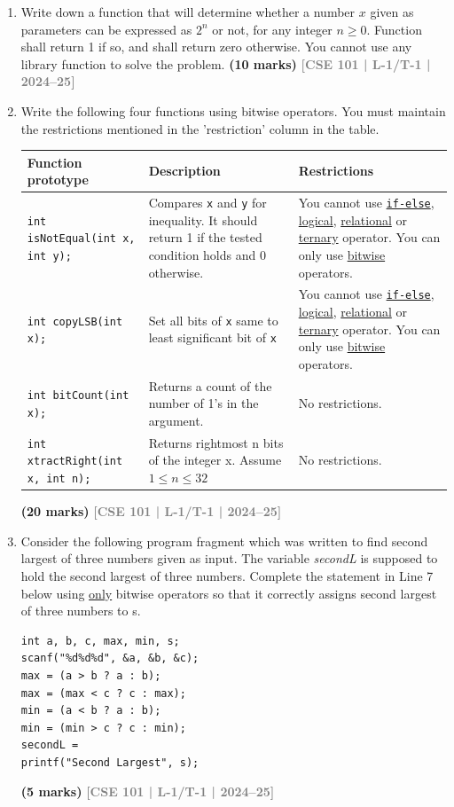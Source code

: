\documentclass[12pt,a3paper]{article}
\newcommand{\yr}[1]{\hfill\textcolor{gray}{\small\textbf{[#1]}}}
\newcommand{\mk}[1]{\textcolor{orange!70!black}{\small\textbf{(#1 marks)}}}
\begin{document}
\begin{enumerate}

\item Write down a function that will determine whether a number $x$ given as parameters can be expressed as $2^n$ or not, for any integer $n \geq 0$. Function shall return 1 if so, and shall return zero otherwise. You cannot use any library function to solve the problem.
\mk{10} \yr{CSE 101 | L-1/T-1 | 2024--25}

\item Write the following four functions using bitwise operators. You must maintain the restrictions mentioned in the 'restriction' column in the table.
    
   \begin{center}
    \begin{tabular}{|p{4.5cm}|p{4.5cm}|p{4.5cm}|}
        \hline
        \textbf{Function prototype} & \centering\textbf{Description} & \textbf{Restrictions} \\ \hline
        \texttt{int isNotEqual(int x, int y);} & Compares \texttt{x} and \texttt{y} for inequality. It should return 1 if the tested condition holds and 0 otherwise. & You cannot use \underline{\texttt{if-else}}, \underline{logical}, \underline{relational} or \underline{ternary} operator. You can only use \underline{bitwise} operators. \\ \hline
        \texttt{int copyLSB(int x);} & Set all bits of \texttt{x} same to least significant bit of \texttt{x} & You cannot use \underline{\texttt{if-else}}, \underline{logical}, \underline{relational} or \underline{ternary} operator. You can only use \underline{bitwise} operators. \\ \hline
        \texttt{int bitCount(int x);} & Returns a count of the number of 1's in the argument. & No restrictions. \\ \hline
        \texttt{int xtractRight(int x, int n);} & Returns rightmost n bits of the integer x. Assume $1 \leq n \leq 32$ & No restrictions. \\ \hline
    \end{tabular}
  \end{center}
\mk{20} \yr{CSE 101 | L-1/T-1 | 2024--25}


\item Consider the following program fragment which was written to find second largest of three numbers given as input. The variable \textit{secondL} is supposed to hold the second largest of three numbers. Complete the statement in Line 7 below using \underline{only} bitwise operators so that it correctly assigns second largest of three numbers to s.
\begin{lstlisting}
int a, b, c, max, min, s;
scanf("%d%d%d", &a, &b, &c);
max = (a > b ? a : b);
max = (max < c ? c : max);
min = (a < b ? a : b);
min = (min > c ? c : min);
secondL = 
printf("Second Largest", s);
\end{lstlisting}
\mk{5} \yr{CSE 101 | L-1/T-1 | 2024--25}


\end{enumerate}
\end{document}
